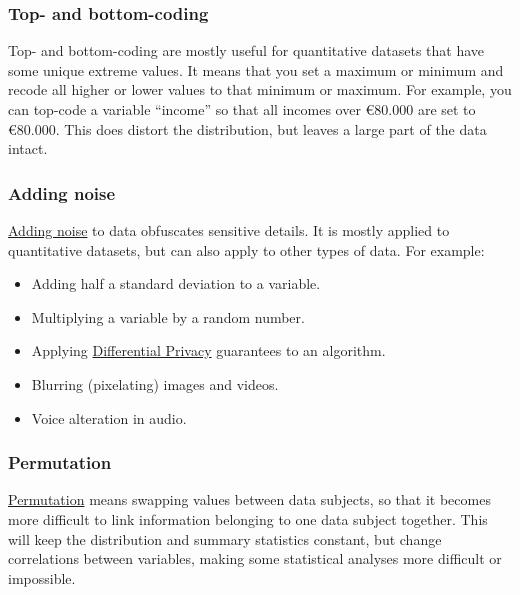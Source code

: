 \documentclass[
]{book}
\providecommand{\tightlist}{%
  \setlength{\itemsep}{0pt}\setlength{\parskip}{0pt}}
\begin{document}
\hypertarget{top-bottom-coding}{%
\subsubsection{Top- and bottom-coding}\label{top-bottom-coding}}

Top- and bottom-coding are mostly useful for quantitative datasets that have
some unique extreme values. It means that you set a maximum or minimum and
recode all higher or lower values to that minimum or maximum. For example, you
can top-code a variable ``income'' so that all incomes over €80.000 are set to
€80.000. This does distort the distribution, but leaves a large part of the data
intact.

\hypertarget{adding-noise}{%
\subsubsection{Adding noise}\label{adding-noise}}

\href{https://ec.europa.eu/justice/article-29/documentation/opinion-recommendation/files/2014/wp216_en.pdf\#page=12}{Adding noise}
to data obfuscates sensitive details. It is mostly applied to quantitative
datasets, but can also apply to other types of data. For example:

\begin{itemize}
\tightlist
\item
  Adding half a standard deviation to a variable.
\item
  Multiplying a variable by a random number.
\item
  Applying \protect\hyperlink{differential-privacy}{Differential Privacy} guarantees to an algorithm.
\item
  Blurring (pixelating) images and videos.
\item
  Voice alteration in audio.
\end{itemize}

\hypertarget{permutation}{%
\subsubsection{Permutation}\label{permutation}}

\href{https://ec.europa.eu/justice/article-29/documentation/opinion-recommendation/files/2014/wp216_en.pdf\#page=13}{Permutation}
means swapping values between data subjects, so that it becomes more difficult
to link information belonging to one data subject together. This will keep the
distribution and summary statistics constant, but change correlations between
variables, making some statistical analyses more difficult or impossible.
\end{document}
